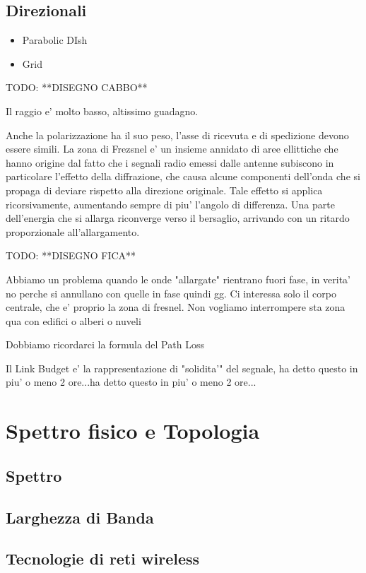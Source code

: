 \subsection{Direzionali}
\begin{itemize}
\item Parabolic DIsh
\item Grid
\end{itemize}
TODO: **DISEGNO CABBO**

Il raggio e' molto basso, altissimo guadagno.

Anche la polarizzazione ha il suo peso, l'asse di ricevuta e di spedizione devono essere simili. La zona di Frezsnel e' un insieme annidato di aree ellittiche che hanno origine dal fatto che i segnali radio emessi dalle antenne subiscono in particolare l'effetto della diffrazione, che causa alcune componenti dell'onda che si propaga di deviare rispetto alla direzione originale. Tale effetto si applica ricorsivamente, aumentando sempre di piu' l'angolo di differenza. Una parte dell'energia che si allarga riconverge verso il bersaglio, arrivando con un ritardo proporzionale all'allargamento.

TODO: **DISEGNO FICA**

Abbiamo un problema quando le onde "allargate" rientrano fuori fase, in verita' no perche si annullano con quelle in fase quindi gg. Ci interessa solo il corpo centrale, che e' proprio la zona di fresnel. Non vogliamo interrompere sta zona qua con edifici o alberi o nuveli

Dobbiamo ricordarci la formula del Path Loss

Il Link Budget e' la rappresentazione di "solidita'" del segnale, ha detto questo in piu' o meno 2 ore...ha detto questo in piu' o meno 2 ore...

\section{Spettro fisico e Topologia}
\subsection{Spettro}
\subsection{Larghezza di Banda}
\subsection{Tecnologie di reti wireless}
% 
